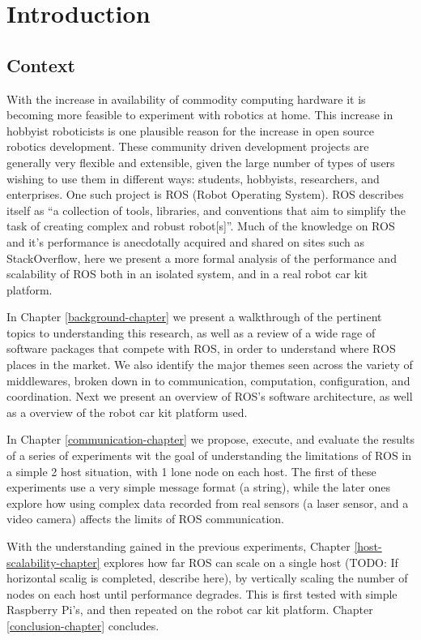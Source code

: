 \documentclass[../dissertation.tex]{subfiles}
\begin{document}
\chapter{Introduction}
\label{introduction-chapter}

\section{Context}

With the increase in availability of commodity computing hardware it is becoming more feasible to experiment with robotics at home. This increase in hobbyist roboticists is one plausible reason for the increase in open source robotics development. These community driven development projects are generally very flexible and extensible, given the large number of types of users wishing to use them in different ways: students, hobbyists, researchers, and enterprises. One such project is ROS (Robot Operating System). ROS describes itself as ``a collection of tools, libraries, and conventions that aim to simplify the task of creating complex and robust robot[s]''\cite{rosaboutpage}. Much of the knowledge on ROS and it's performance is anecdotally acquired and shared on sites such as StackOverflow, here we present a more formal analysis of the performance and scalability of ROS both in an isolated system, and in a real robot car kit platform.

In Chapter \ref{background-chapter} we present a walkthrough of the pertinent topics to understanding this research, as well as a review of a wide rage of software packages that compete with ROS, in order to understand where ROS places in the market. We also identify the major themes seen across the variety of middlewares, broken down in to communication, computation, configuration, and coordination. Next we present an overview of ROS's software architecture, as well as a overview of the robot car kit platform used.

In Chapter \ref{communication-chapter} we propose, execute, and evaluate the results of a series of experiments wit the goal of understanding the limitations of ROS in a simple 2 host situation, with 1 lone node on each host. The first of these experiments use a very simple message format (a string), while the later ones explore how using complex data recorded from real sensors (a laser sensor, and a video camera) affects the limits of ROS communication.

With the understanding gained in the previous experiments, Chapter \ref{host-scalability-chapter} explores how far ROS can scale on a single host (TODO: If horizontal scalig is completed, describe here), by vertically scaling the number of nodes on each host until performance degrades. This is first tested with simple Raspberry Pi's, and then repeated on the robot car kit platform. Chapter \ref{conclusion-chapter} concludes.
\end{document}
